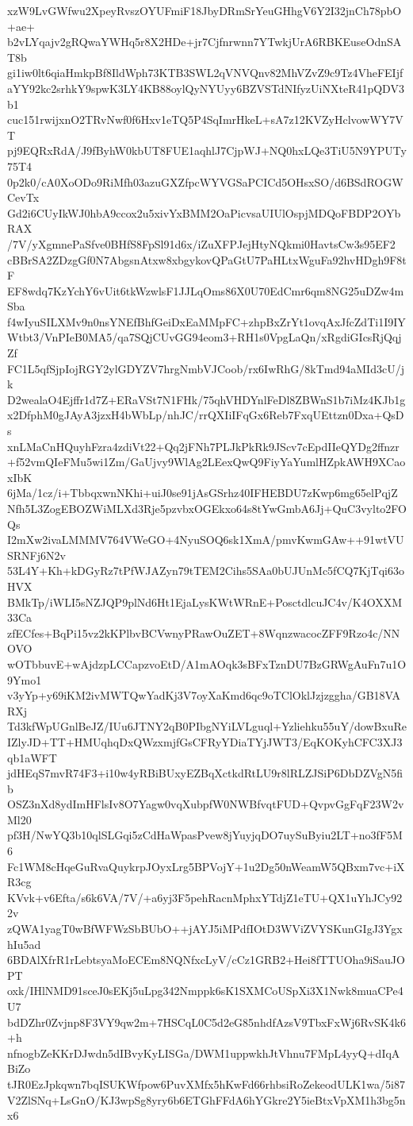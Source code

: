xzW9LvGWfwu2XpeyRvszOYUFmiF18JbyDRmSrYeuGHhgV6Y2I32jnCh78pbO+ae+
b2vLYqajv2gRQwaYWHq5r8X2HDe+jr7Cjfnrwnn7YTwkjUrA6RBKEuseOdnSAT8b
gi1iw0lt6qiaHmkpBf8IldWph73KTB3SWL2qVNVQnv82MhVZvZ9c9Tz4VheFEIjf
aYY92kc2srhkY9spwK3LY4KB88oylQyNYUyy6BZVSTdNIfyzUiNXteR41pQDV3b1
cuc151rwijxnO2TRvNwf0f6Hxv1eTQ5P4SqImrHkeL+sA7z12KVZyHclvowWY7VT
pj9EQRxRdA/J9fByhW0kbUT8FUE1aqhlJ7CjpWJ+NQ0hxLQe3TiU5N9YPUTy75T4
0p2k0/cA0XoODo9RiMfh03azuGXZfpcWYVGSaPCICd5OHsxSO/d6BSdROGWCevTx
Gd2i6CUyIkWJ0hbA9ccox2u5xivYxBMM2OaPicvsaUIUlOspjMDQoFBDP2OYbRAX
/7V/yXgmnePaSfve0BHfS8FpSl91d6x/iZuXFPJejHtyNQkmi0HavtsCw3s95EF2
cBBrSA2ZDzgGf0N7AbgsnAtxw8xbgykovQPaGtU7PaHLtxWguFa92hvHDgh9F8tF
EF8wdq7KzYchY6vUit6tkWzwlsF1JJLqOms86X0U70EdCmr6qm8NG25uDZw4mSba
f4wIyuSILXMv9n0nsYNEfBhfGeiDxEaMMpFC+zhpBxZrYt1ovqAxJfcZdTi1I9IY
Wtbt3/VnPIeB0MA5/qa7SQjCUvGG94eom3+RH1s0VpgLaQn/xRgdiGIcsRjQqjZf
FC1L5qfSjpIojRGY2ylGDYZV7hrgNmbVJCoob/rx6IwRhG/8kTmd94aMId3cU/jk
D2wealaO4Ejffr1d7Z+ERaVSt7N1FHk/75qhVHDYnlFeDl8ZBWnS1b7iMz4KJb1g
x2DfphM0gJAyA3jzxH4bWbLp/nhJC/rrQXIiIFqGx6Reb7FxqUEttzn0Dxa+QsDs
xnLMaCnHQuyhFzra4zdiVt22+Qq2jFNh7PLJkPkRk9JScv7cEpdIIeQYDg2ffnzr
+f52vmQIeFMu5wi1Zm/GaUjvy9WlAg2LEexQwQ9FiyYaYumlHZpkAWH9XCaoxIbK
6jMa/1cz/i+TbbqxwnNKhi+uiJ0se91jAsGSrhz40IFHEBDU7zKwp6mg65elPqjZ
Nfh5L3ZogEBOZWiMLXd3Rje5pzvbxOGEkxo64s8tYwGmbA6Jj+QuC3vylto2FOQs
I2mXw2ivaLMMMV764VWeGO+4NyuSOQ6sk1XmA/pmvKwmGAw++91wtVUSRNFj6N2v
53L4Y+Kh+kDGyRz7tPfWJAZyn79tTEM2Cihs5SAa0bUJUnMc5fCQ7KjTqi63oHVX
BMkTp/iWLI5sNZJQP9plNd6Ht1EjaLysKWtWRnE+PosctdlcuJC4v/K4OXXM33Ca
zfECfes+BqPi15vz2kKPlbvBCVwnyPRawOuZET+8WqnzwacocZFF9Rzo4c/NNOVO
wOTbbuvE+wAjdzpLCCapzvoEtD/A1mAOqk3sBFxTznDU7BzGRWgAuFn7u1O9Ymo1
v3yYp+y69iKM2ivMWTQwYadKj3V7oyXaKmd6qc9oTClOklJzjzggha/GB18VARXj
Td3kfWpUGnlBeJZ/IUu6JTNY2qB0PIbgNYiLVLguql+Yzliehku55uY/dowBxuRe
IZlyJD+TT+HMUqhqDxQWzxmjfGsCFRyYDiaTYjJWT3/EqKOKyhCFC3XJ3qb1aWFT
jdHEqS7mvR74F3+i10w4yRBiBUxyEZBqXctkdRtLU9r8lRLZJSiP6DbDZVgN5fib
OSZ3nXd8ydImHFlsIv8O7Yagw0vqXubpfW0NWBfvqtFUD+QvpvGgFqF23W2vMl20
pf3H/NwYQ3b10qlSLGqi5zCdHaWpasPvew8jYuyjqDO7uySuByiu2LT+no3fF5M6
Fc1WM8cHqeGuRvaQuykrpJOyxLrg5BPVojY+1u2Dg50nWeamW5QBxm7vc+iXR3cg
KVvk+v6Efta/s6k6VA/7V/+a6yj3F5pehRacnMphxYTdjZ1eTU+QX1uYhJCy922v
zQWA1yagT0wBfWFWzSbBUbO++jAYJ5iMPdfIOtD3WViZVYSKunGIgJ3YgxhIu5ad
6BDAlXfrR1rLebtsyaMoECEm8NQNfxcLyV/cCz1GRB2+Hei8fTTUOha9iSauJOPT
oxk/IHlNMD91sceJ0sEKj5uLpg342Nmppk6sK1SXMCoUSpXi3X1Nwk8muaCPe4U7
bdDZhr0Zvjnp8F3VY9qw2m+7HSCqL0C5d2eG85nhdfAzsV9TbxFxWj6RvSK4k6+h
nfnogbZeKKrDJwdn5dIBvyKyLISGa/DWM1uppwkhJtVhnu7FMpL4yyQ+dIqABiZo
tJR0EzJpkqwn7bqISUKWfpow6PuvXMfx5hKwFd66rhbsiRoZekeodULK1wa/5i87
V2ZlSNq+LsGnO/KJ3wpSg8yry6b6ETGhFFdA6hYGkre2Y5ieBtxVpXM1h3bg5nx6

